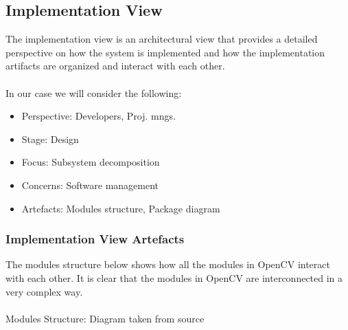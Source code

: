 \subsection{Implementation View\label{subSection::ImplementationView}} 
The implementation view is an architectural view that  provides a detailed perspective on how the system is implemented and how the implementation artifacts are organized and interact with each other.\\\\
     In our case we will consider the following:
     \begin{itemize}
         \item Perspective: Developers, Proj. mngs.
         \item Stage: Design
         \item Focus: Subsystem decomposition
         \item Concerns: Software management
         \item Artefacts: Modules structure, Package diagram
     \end{itemize}
\subsubsection{Implementation View Artefacts\label{subsubSection::ImplementationView}} 
The modules structure below shows how all the modules in OpenCV interact with each other. It is clear that the modules in OpenCV are interconnected in a very complex way. \\\\

Modules Structure: Diagram taken from source \cite{OGB} 

